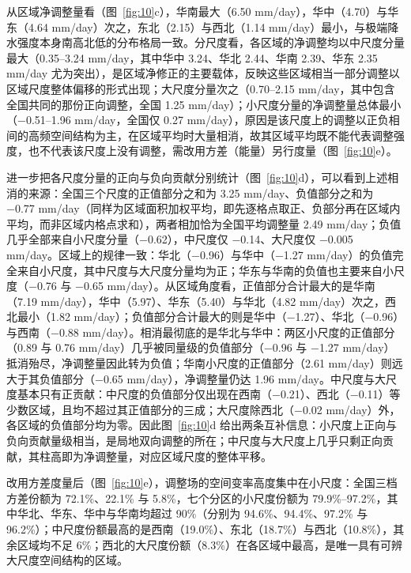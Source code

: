 \documentclass[draft]{agujournal2019}
\begin{document}
从区域净调整量看（图~\ref{fig:10}c），华南最大（6.50 mm/day），华中（4.70）与华东（4.64 mm/day）次之，东北（2.15）与西北（1.14 mm/day）最小，与极端降水强度本身南高北低的分布格局一致。分尺度看，各区域的净调整均以中尺度分量最大（0.35--3.24 mm/day，其中华中 3.24、华北 2.44、华南 2.39、华东 2.35 mm/day 尤为突出），是区域净修正的主要载体，反映这些区域相当一部分调整以区域尺度整体偏移的形式出现；大尺度分量次之（0.70--2.15 mm/day，其中包含全国共同的那份正向调整，全国 1.25 mm/day）；小尺度分量的净调整量总体最小（−0.51--1.96 mm/day，全国仅 0.27 mm/day），原因是该尺度上的调整以正负相间的高频空间结构为主，在区域平均时大量相消，故其区域平均既不能代表调整强度，也不代表该尺度上没有调整，需改用方差（能量）另行度量（图~\ref{fig:10}e）。

进一步把各尺度分量的正向与负向贡献分别统计（图~\ref{fig:10}d），可以看到上述相消的来源：全国三个尺度的正值部分之和为 3.25 mm/day、负值部分之和为 −0.77 mm/day（同样为区域面积加权平均，即先逐格点取正、负部分再在区域内平均，而非区域内格点求和），两者相加恰为全国平均调整量 2.49 mm/day；负值几乎全部来自小尺度分量（−0.62），中尺度仅 −0.14、大尺度仅 −0.005 mm/day。区域上的规律一致：华北（−0.96）与华中（−1.27 mm/day）的负值完全来自小尺度，其中尺度与大尺度分量均为正；华东与华南的负值也主要来自小尺度（−0.76 与 −0.65 mm/day）。从区域角度看，正值部分合计最大的是华南（7.19 mm/day），华中（5.97）、华东（5.40）与华北（4.82 mm/day）次之，西北最小（1.82 mm/day）；负值部分合计最大的则是华中（−1.27）、华北（−0.96）与西南（−0.88 mm/day）。相消最彻底的是华北与华中：两区小尺度的正值部分（0.89 与 0.76 mm/day）几乎被同量级的负值部分（−0.96 与 −1.27 mm/day）抵消殆尽，净调整量因此转为负值；华南小尺度的正值部分（2.61 mm/day）则远大于其负值部分（−0.65 mm/day），净调整量仍达 1.96 mm/day。中尺度与大尺度基本只有正贡献：中尺度的负值部分仅出现在西南（−0.21）、西北（−0.11）等少数区域，且均不超过其正值部分的三成；大尺度除西北（−0.02 mm/day）外，各区域的负值部分均为零。因此图~\ref{fig:10}d 给出两条互补信息：小尺度上正向与负向贡献量级相当，是局地双向调整的所在；中尺度与大尺度上几乎只剩正向贡献，其柱高即为净调整量，对应区域尺度的整体平移。

改用方差度量后（图~\ref{fig:10}e），调整场的空间变率高度集中在小尺度：全国三档方差份额为 72.1\%、22.1\% 与 5.8\%，七个分区的小尺度份额为 79.9\%--97.2\%，其中华北、华东、华中与华南均超过 90\%（分别为 94.6\%、94.4\%、97.2\% 与 96.2\%）；中尺度份额最高的是西南（19.0\%）、东北（18.7\%）与西北（10.8\%），其余区域均不足 6\%；西北的大尺度份额（8.3\%）在各区域中最高，是唯一具有可辨大尺度空间结构的区域。
\end{document}
